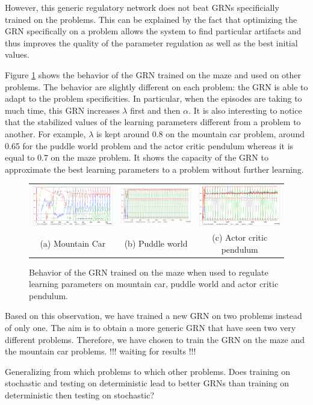 However, this generic regulatory network does not beat GRNs specificially trained on the problems. This can be explained by the fact that optimizing the GRN specifically on a problem allows the system to find particular artifacts and thus improves the quality of the parameter regulation as well as the best initial values.

Figure \ref{fig:all:GRNMazeBehavior} shows the behavior of the GRN trained on the maze and used on other problems. The behavior are slightly different on each problem: the GRN is able to adapt to the problem specificities. In particular, when the episodes are taking to much time, this GRN increases $\lambda$ first and then $\alpha$. It is also interesting to notice that the stabilized values of the learning parameters different from a problem to another. For example, $\lambda$ is kept around 0.8 on the mountain car problem, around 0.65 for the puddle world problem and the actor critic pendulum whereas it is equal to 0.7 on the maze problem. It shows the capacity of the GRN to approximate the best learning parameters to a problem without further learning.

\begin{figure}[t!]
\center
\begin{tabular}{ccc}
\includegraphics[width=0.32\linewidth]{MC_GRNMazeBehavior.pdf} &
\includegraphics[width=0.32\linewidth]{PW_GRNMazeBehavior.pdf} &
\includegraphics[width=0.32\linewidth]{ACP_GRNMazeBehavior.pdf} \\
(a) Mountain Car & (b) Puddle world & (c) Actor critic pendulum 
\end{tabular}
\caption{Behavior of the GRN trained on the maze when used to regulate learning parameters on mountain car, puddle world and actor critic pendulum.}\label{fig:all:GRNMazeBehavior}
\end{figure}

Based on this observation, we have trained a new GRN on two problems instead of only one. The aim is to obtain a more generic GRN that have seen two very different problems. Therefore, we have chosen to train the GRN on the maze and the mountain car problems. !!! waiting for results !!!


Generalizing from which problems to which other problems. Does training on stochastic and testing on deterministic lead to better GRNs than training on
deterministic then testing on stochastic?
